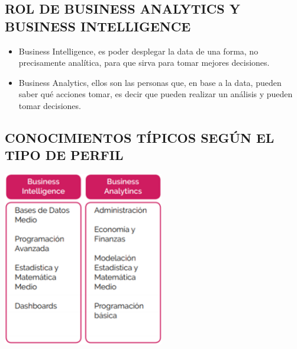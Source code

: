 \documentclass[twoside,twocolumn]{article}
\begin{document}
\subsection{ROL DE BUSINESS ANALYTICS Y BUSINESS INTELLIGENCE}
\begin{itemize}
    \item Business Intelligence, es poder desplegar la data de una forma, no precisamente analítica, para que sirva para tomar mejores decisiones.
    \item Business Analytics, ellos son las personas que, en base a la data, pueden saber qué acciones tomar, es decir que pueden realizar un análisis y pueden tomar decisiones.
\end{itemize}

\subsection{CONOCIMIENTOS TÍPICOS SEGÚN EL TIPO DE PERFIL}
\begin{center}
    \includegraphics[width=7cm]{./img/img4.png} 
\end{center}

\end{document}
